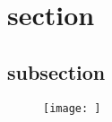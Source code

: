 \documentclass[a4paper]{jsarticle}
\begin{document}
\title{}
\author{松崎　黎}
\maketitle

\section{section}
\subsection{subsection}

\begin{figure}[h]
 \begin{center}
  \texttt{[image: ]}
  \label{}
  \caption{}
 \end{center}
\end{figure}



\end{document}
